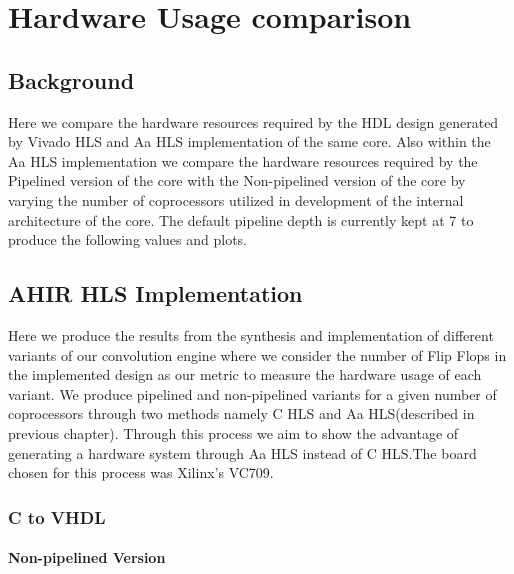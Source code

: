 \chapter{Hardware Usage comparison}

\section{Background}

Here we compare the hardware resources required by the HDL design generated by Vivado HLS and Aa HLS implementation of the same core.
Also within the Aa HLS implementation we compare the hardware resources required by the Pipelined version of the core with the Non-pipelined
version of the core by varying the number of coprocessors utilized in development of the internal architecture of the core. The default
pipeline depth is currently kept at 7 to produce the following values and plots.


\section{AHIR HLS Implementation}

Here we produce the results from the synthesis and implementation of different variants of our convolution engine where we consider the
number of Flip Flops in the implemented design as our metric to measure the hardware usage of each variant. We produce pipelined and
non-pipelined variants for a given number of coprocessors through two methods namely C HLS and Aa HLS(described in previous chapter).
Through this process we aim to show the advantage of generating a hardware system through Aa HLS instead of C HLS.The board chosen for this
process was Xilinx's VC709.


\subsection{C to VHDL}

\subsubsection*{Non-pipelined Version}

